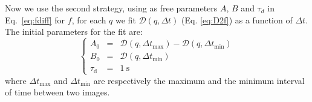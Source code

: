 \documentclass[prb,reprint,amsmath,amssymb]{revtex4-1}
\begin{document}
Now we use the second strategy, using as free parameters $A$, $B$ and $\tau_d$ in Eq.~\eqref{eq:fdiff} for $f$, for each $q$ we fit $\mathcal{D}(q, \Delta t)$ (Eq. \eqref{eq:D2f}) as a function of $\Delta t$. The initial parameters for the fit are:
\begin{equation}
\left\{
\begin{array}{rcl}
A_0 &=& \mathcal{D} (q,\Delta t_\text{max}) - \mathcal{D} (q,\Delta t_\text{min}) \\
B_0 &=& \mathcal{D} (q,\Delta t_\text{min}) \\
\tau_\text{d} &=& \SI{1}{\second}
\end{array}
\right.
\end{equation}
where $\Delta t_\text{max}$ and $\Delta t_\text{min}$ are respectively the maximum and the minimum interval of time between two images.
\end{document}

